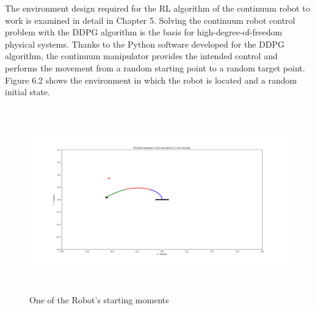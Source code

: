 \documentclass[12pt,twoside,a4]{mwbk}
\begin{document}
\noindent The environment design required for the RL algorithm of the continuum robot to work is examined in detail in Chapter 5. Solving the continuum robot control problem with the DDPG algorithm is the basis for high-degree-of-freedom physical systems. Thanks to the Python software developed for the DDPG algorithm, the continuum manipulator provides the intended control and performs the movement from a random starting point to a random target point. Figure 6.2 shows the environment in which the robot is located and a random initial state.
\newpage
\begin{figure}[h]
    \centering
    \includegraphics[width=16cm, height=8cm]{initial_sim.png}
    \caption{One of the Robot's starting moments}
\end{figure}
\end{document}
